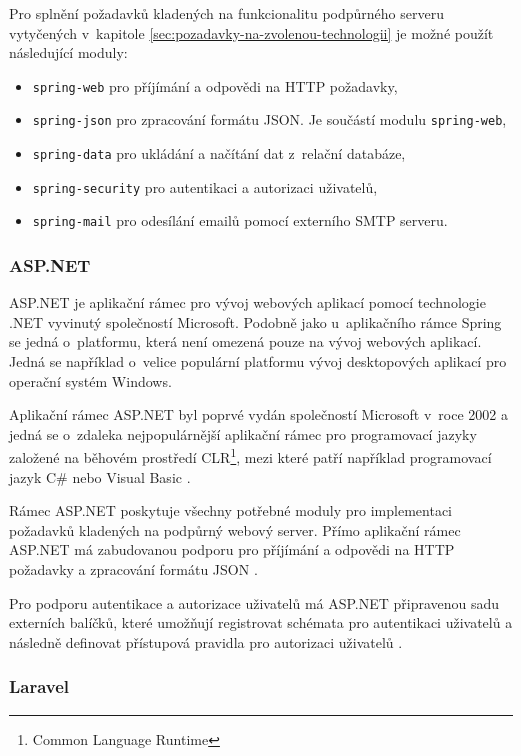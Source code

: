 Pro splnění požadavků kladených na funkcionalitu podpůrného serveru vytyčených v~kapitole \ref{sec:pozadavky-na-zvolenou-technologii} je možné použít následující moduly:

\begin{itemize}
    \item \verb|spring-web| pro příjímání a odpovědi na HTTP požadavky,
    \item \verb|spring-json| pro zpracování formátu JSON. Je součástí modulu \verb|spring-web|,
    \item \verb|spring-data| pro ukládání a načítání dat z~relační databáze,
    \item \verb|spring-security| pro autentikaci a autorizaci uživatelů,
    \item \verb|spring-mail| pro odesílání emailů pomocí externího SMTP serveru.
\end{itemize}

\subsubsection{ASP.NET}

ASP.NET je aplikační rámec pro vývoj webových aplikací pomocí technologie .NET vyvinutý společností Microsoft. Podobně jako u~aplikačního rámce Spring se jedná o~platformu, která není omezená pouze na vývoj webových aplikací. Jedná se například o~velice populární platformu vývoj desktopových aplikací pro operační systém Windows.

Aplikační rámec ASP.NET byl poprvé vydán společností Microsoft v~roce 2002 \cite{bekker_microsoft_2002} a jedná se o~zdaleka nejpopulárnější aplikační rámec pro programovací jazyky založené na běhovém prostředí CLR\footnote{Common Language Runtime}, mezi které patří například programovací jazyk C\# nebo Visual Basic \cite{warren_clr_2022}.

Rámec ASP.NET poskytuje všechny potřebné moduly pro implementaci požadavků kladených na podpůrný webový server. Přímo aplikační rámec ASP.NET má zabudovanou podporu pro příjímání a odpovědi na HTTP požadavky a zpracování formátu JSON \cite{dotnet_web_2023}.

Pro podporu autentikace a autorizace uživatelů má ASP.NET připravenou sadu externích balíčků, které umožňují registrovat schémata pro autentikaci uživatelů a následně definovat přístupová pravidla pro autorizaci uživatelů \cite{dotnet_security_2022}.

\subsubsection{Laravel}

